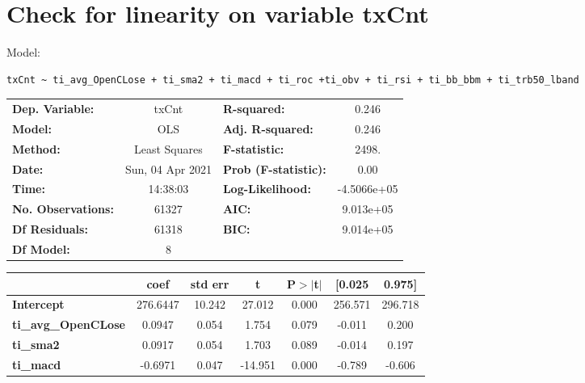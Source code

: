 \section{Check for linearity on variable txCnt}

Model: \begin{verbatim}txCnt ~ ti_avg_OpenCLose + ti_sma2 + ti_macd + ti_roc +ti_obv + ti_rsi + ti_bb_bbm + ti_trb50_lband\end{verbatim}

\begin{center}
\begin{tabular}{lclc}
\toprule
\textbf{Dep. Variable:}     &      txCnt       & \textbf{  R-squared:         } &      0.246   \\
\textbf{Model:}             &       OLS        & \textbf{  Adj. R-squared:    } &      0.246   \\
\textbf{Method:}            &  Least Squares   & \textbf{  F-statistic:       } &      2498.   \\
\textbf{Date:}              & Sun, 04 Apr 2021 & \textbf{  Prob (F-statistic):} &      0.00    \\
\textbf{Time:}              &     14:38:03     & \textbf{  Log-Likelihood:    } & -4.5066e+05  \\
\textbf{No. Observations:}  &       61327      & \textbf{  AIC:               } &  9.013e+05   \\
\textbf{Df Residuals:}      &       61318      & \textbf{  BIC:               } &  9.014e+05   \\
\textbf{Df Model:}          &           8      & \textbf{                     } &              \\
\bottomrule
\end{tabular}
\begin{tabular}{lcccccc}
                            & \textbf{coef} & \textbf{std err} & \textbf{t} & \textbf{P$> |$t$|$} & \textbf{[0.025} & \textbf{0.975]}  \\
\midrule
\textbf{Intercept}          &     276.6447  &       10.242     &    27.012  &         0.000        &      256.571    &      296.718     \\
\textbf{ti\_avg\_OpenCLose} &       0.0947  &        0.054     &     1.754  &         0.079        &       -0.011    &        0.200     \\
\textbf{ti\_sma2}           &       0.0917  &        0.054     &     1.703  &         0.089        &       -0.014    &        0.197     \\
\textbf{ti\_macd}           &      -0.6971  &        0.047     &   -14.951  &         0.000        &       -0.789    &       -0.606     \\

\end{tabular}
\end{center}
